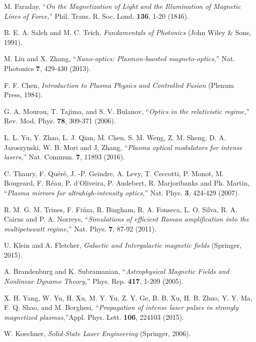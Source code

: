\documentclass[%
aps,
preprint,
showpacs,
preprintnumbers,
 amsmath,
 amssymb,
 prl,
]{revtex4-1}
\begin{document}
\begin{thebibliography}{9}


 M. Faraday, ``\emph{On the Magnetization of Light and the Illumination of Magnetic Lines of Force,}'' Phil. Trans. R. Soc. Lond. \textbf{136}, 1-20 (1846).

 B. E. A. Saleh and M. C. Teich, \emph{Fundamentals of Photonics} (John Wiley \& Sons, 1991).

 M. Liu and X. Zhang, ``\emph{Nano-optics: Plasmon-boosted magneto-optics,}'' Nat. Photonics \textbf{7}, 429-430 (2013).

 F. F. Chen, \emph{Introduction to Plasma Physics and Controlled Fusion} (Plenum Press,  1984).

 G. A. Mourou, T. Tajima, and S. V. Bulanov, ``\emph{Optics in the relativistic regime,}'' Rev. Mod. Phys. \textbf{78}, 309-371 (2006).

 L. L. Yu, Y. Zhao, L. J. Qian, M. Chen, S. M. Weng, Z. M. Sheng, D. A. Jaroszynski, W. B. Mori and J. Zhang, ``\emph{Plasma optical modulators for intense lasers,}'' Nat. Commun. \textbf{7}, 11893 (2016).

 C. Thaury, F. Qu\'{e}r\'{e}, J. -P. Geindre,  A. Levy, T. Ceccotti, P. Monot, M. Bougeard, F. R\'{e}au, P. d'Oliveira, P. Audebert, R. Marjoribanks and Ph. Martin, ``\emph{Plasma mirrors for ultrahigh-intensity optics,}'' Nat. Phys. \textbf{3}, 424-429 (2007).

  R. M. G. M. Trines, F. Fi\'{u}za, R. Bingham, R. A. Fonseca, L. O. Silva, R. A. Cairns and P. A. Norreys, ``\emph{Simulations of efficient Raman amplification into the multipetawatt regime,}'' Nat. Phys. \textbf{7}, 87-92 (2011).

 U. Klein and A. Fletcher, \emph{Galactic and Intergalactic magnetic fields} (Springer,  2015).

 A. Brandenburg and K. Subramanian, ``\emph{Astrophysical Magnetic Fields and Nonlinear Dynamo Theory,}'' Phys. Rep. \textbf{417}, 1-209 (2005).

 X. H. Yang, W. Yu, H. Xu, M. Y. Yu, Z. Y. Ge, B. B. Xu, H. B. Zhuo, Y. Y. Ma, F. Q. Shao, and M. Borghesi, ``\emph{Propagation of intense laser pulses in strongly magnetized plasmas,}''Appl. Phys. Lett. \textbf{106}, 224103 (2015).

 W. Koechner, \emph{Solid-State Laser Engineering} (Springer, 2006).


\end{thebibliography}
\end{document}
